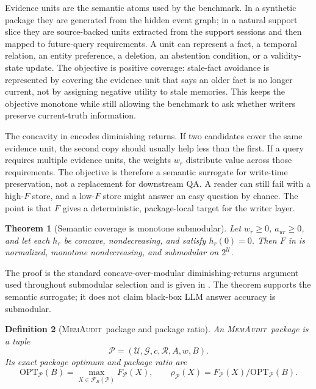 \documentclass{article}
\newtheorem{theorem}{Theorem}
\newtheorem{definition}[theorem]{Definition}
\theoremstyle{remark}
\theoremstyle{plain}
\newcommand{\method}{\textsc{MemAudit}}
\newcommand{\budget}{B}
\newcommand{\ground}{\mathcal{U}}
\newcommand{\units}{\mathcal{R}}
\newcommand{\feasible}{\mathcal{F}}
\newcommand{\package}{\mathcal{P}}
\newcommand{\opt}{\mathrm{OPT}}
\begin{document}
Evidence units are the semantic atoms used by the benchmark. In a synthetic package they are generated from the hidden event graph; in a natural support slice they are source-backed units extracted from the support sessions and then mapped to future-query requirements. A unit can represent a fact, a temporal relation, an entity preference, a deletion, an abstention condition, or a validity-state update. The objective is positive coverage: stale-fact avoidance is represented by covering the evidence unit that says an older fact is no longer current, not by assigning negative utility to stale memories. This keeps the objective monotone while still allowing the benchmark to ask whether writers preserve current-truth information.

The concavity in  encodes diminishing returns. If two candidates cover the same evidence unit, the second copy should usually help less than the first. If a query requires multiple evidence units, the weights $w_r$ distribute value across those requirements. The objective is therefore a semantic surrogate for write-time preservation, not a replacement for downstream QA. A reader can still fail with a high-$F$ store, and a low-$F$ store might answer an easy question by chance. The point is that $F$ gives a deterministic, package-local target for the writer layer.

\begin{theorem}[Semantic coverage is monotone submodular]\label{thm:coverage}
Let $w_r\geq0$, $a_{ur}\geq0$, and let each $h_r$ be concave, nondecreasing, and satisfy $h_r(0)=0$. Then $F$ in  is normalized, monotone nondecreasing, and submodular on $2^\ground$.
\end{theorem}
The proof is the standard concave-over-modular diminishing-returns argument used throughout submodular selection \cite{nemhauser1978} and is given in . The theorem supports the semantic surrogate; it does not claim black-box LLM answer accuracy is submodular.

\begin{definition}[\method\ package and package ratio]\label{def:package}
An \method\ package is a tuple
\[
\package=(\ground,\mathcal{G},c,\units,A,w,\budget).
\]
Its exact package optimum and package ratio are
\[
\opt_{\package}(\budget)=\max_{X\in\feasible_\budget(\package)}F_{\package}(X),
\qquad
\rho_{\package}(X)=F_{\package}(X)/\opt_{\package}(\budget).
\]
\end{definition}
\end{document}
